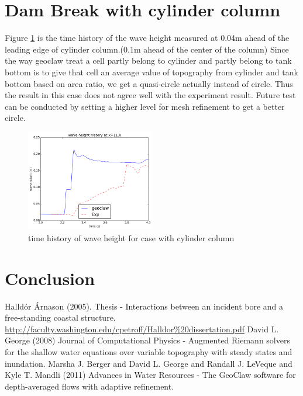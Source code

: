 \documentclass[11pt]{article}
\begin{document}
\section{Dam Break with cylinder column}\label{Sec:Cylinder}
Figure \ref{fig:waveheight_cylinder_x=11.0} is the time history of the wave height measured at 0.04m ahead of the leading edge of cylinder column.(0.1m ahead of the center of the column)
Since the way geoclaw treat a cell partly belong to cylinder and partly belong to tank bottom is to give that cell an average value of topography from cylinder and tank bottom based on area ratio, we get a quasi-circle actually instead of circle. Thus the result in this case does not agree well with the experiment result. 
Future test can be conducted by setting a higher level for mesh refinement to get a better circle.
\begin{figure}[h!]
    \centering
    \includegraphics[width=0.5\textwidth]{./plots/waveheight_cylinder_x=11}
    \caption{time history of wave height for case with cylinder column}
    \label{fig:waveheight_cylinder_x=11.0}
\end{figure}

\section{Conclusion}\label{Sec:Conclusion}
{\footnotesize
\begin{thebibliography}{100}
 Halld\'or \'Arnason  (2005). Thesis - Interactions between an incident bore and a free-standing coastal structure. \url{http://faculty.washington.edu/cpetroff/Halldor%20dissertation.pdf}
 David L. George (2008) Journal of Computational Physics - Augmented Riemann solvers for the shallow water equations over variable topography with steady states and inundation.
 Marsha J. Berger and David L. George and Randall J. LeVeque and Kyle T. Mandli (2011) Advances in Water Resources - The GeoClaw software for depth-averaged flows with adaptive refinement.
\end{thebibliography}
}
\end{document}
